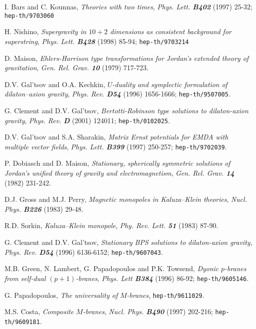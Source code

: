 \documentclass[a4paper,12pt]{article}
\begin{document}
\begin{thebibliography}{99}
    I. Bars and C. Kounnas,
    {\sl Theories with two times},
    {\it Phys. Lett. \bf B402} (1997) 25-32;
    {\tt hep-th/9703060}

    H. Nishino,
    {\sl Supergravity in $10+2$ dimensions as consistent background for
         superstring},
    {\it Phys. Lett. \bf B428} (1998) 85-94;
    {\tt hep-th/9703214}

    D. Maison,
    {\sl Ehlers-Harrison type transformations for Jordan's extended
         theory of gravitation},
    {\it Gen. Rel. Grav. \bf 10} (1979) 717-723.

    D.V. Gal'tsov and O.A. Kechkin,
    {\sl $U$-duality and symplectic formulation of dilaton--axion gravity},
    {\it Phys. Rev. \bf D54} (1996) 1656-1666;
    {\tt hep-th/9507005}.

    G. Clement and D.V. Gal'tsov,
    {\sl Bertotti-Robinson type solutions to dilaton-axion gravity},
    {\it Phys. Rev. \bf D} (2001) 124011;
    {\tt hep-th/0102025}.

    D.V. Gal'tsov and S.A. Sharakin,
    {\sl Matrix Ernst potentials for EMDA with multiple vector fields},
    {\it Phys. Lett. \bf B399} (1997) 250-257;
    {\tt hep-th/9702039}.

    P. Dobiasch and D. Maison,
    {\sl Stationary, spherically symmetric solutions of Jordan's
         unified theory of gravity and electromagnetism},
    {\it Gen. Rel. Grav. \bf 14} (1982) 231-242.

    D.J. Gross and M.J. Perry,
    {\sl Magnetic monopoles in Kaluza--Klein theories},
    {\it Nucl. Phys. \bf B226} (1983) 29-48.

    R.D. Sorkin,
    {\sl Kaluza--Klein monopole},
    {\it Phy. Rev. Lett. \bf 51} (1983) 87-90.

    G. Clement and D.V. Gal'tsov,
    {\sl Stationary BPS solutions to dilaton-axion gravity},
    {\it Phys. Rev. \bf D54} (1996) 6136-6152;
    {\tt hep-th/9607043}.

    M.B. Green, N. Lambert, G. Papadopoulos and P.K. Towsend,
    {\sl Dyonic $p$-branes from self-dual $(p+1)$-branes},
    {\it Phys. Lett \bf B384} (1996) 86-92;
    {\tt hep-th/9605146}.

    G. Papadopoulos,
    {\sl The universality of $M$-branes},
    {\tt hep-th/9611029}.

    M.S. Costa,
    {\sl Composite $M$-branes},
    {\it Nucl. Phys. \bf B490} (1997) 202-216;
    {\tt hep-th/9609181}.


\end{thebibliography}
\end{document}

